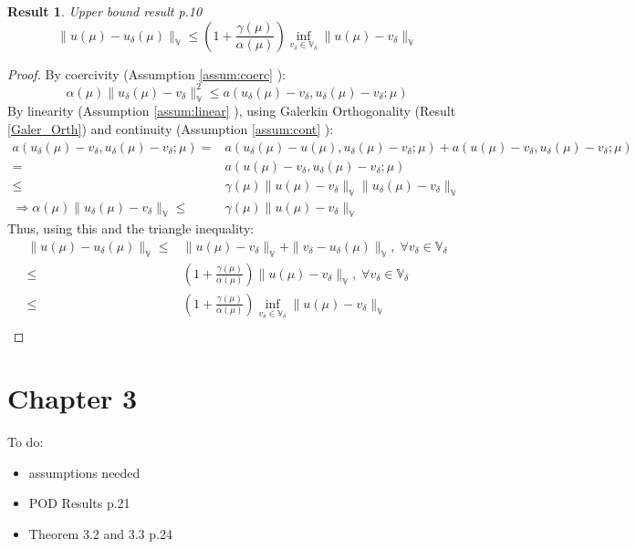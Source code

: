 \documentclass{article}
\newtheorem{result}{Result}
\begin{document}
\begin{result}{Upper bound result p.10}
$$ \| u(\mu )-u_\delta (\mu )\| _\mathbb{V}  \leq \left( 1+\frac{\gamma (\mu )}{\alpha (\mu )} \right) \inf _{v_\delta  \in \mathbb{V}_\delta }\| u(\mu )-v_\delta \| _\mathbb{V} $$
\end{result}

\begin{proof}
By coercivity (Assumption \ref{assum:coerc} ):
$$\alpha (\mu )\| u_ \delta (\mu )-v_\delta \|_\mathbb{V}^2 \leq a(u_ \delta (\mu )-v_\delta ,u_ \delta (\mu )-v_\delta ;\mu ) $$
By linearity (Assumption \ref{assum:linear} ), using Galerkin Orthogonality (Result \ref{Galer_Orth}) and continuity (Assumption \ref{assum:cont} ):
\begin{align*}
a(u_ \delta (\mu )-v_\delta ,u_ \delta (\mu )-v_\delta ;\mu )=&a(u_ \delta (\mu )-u(\mu ) ,u_ \delta (\mu )-v_\delta ;\mu )+a(u(\mu )-v_\delta ,u_ \delta (\mu )-v_\delta ;\mu )\\
=&a(u(\mu )-v_\delta ,u_ \delta (\mu )-v_\delta ;\mu )\\
\leq &\gamma(\mu )\| u(\mu )-v_\delta \|_\mathbb{V} \| u_ \delta (\mu )-v_\delta \|_\mathbb{V}\\
\Rightarrow \alpha (\mu )\| u_ \delta (\mu )-v_\delta \| _\mathbb{V} \leq& \gamma(\mu )\| u(\mu )-v_\delta \|_\mathbb{V}
\end{align*}
Thus, using this and the triangle inequality:
\begin{align*}
\| u(\mu )-u_\delta (\mu )\| _\mathbb{V}  \leq &\| u(\mu )-v_\delta \| _\mathbb{V} + \| v_\delta -u_\delta (\mu )\| _\mathbb{V},\; \forall v_\delta \in \mathbb{V}_\delta \\
\leq &\left ( 1+\frac{\gamma (\mu )}{\alpha(\mu )}\right )\| u(\mu )-v_\delta \| _\mathbb{V},\; \forall v_\delta \in \mathbb{V}_\delta \\
\leq &\left ( 1+\frac{\gamma (\mu )}{\alpha(\mu )}\right )\inf_{v_\delta \in \mathbb{V}_\delta }\| u(\mu )-v_\delta \| _\mathbb{V}\\
\end{align*}

\end{proof}

\section*{Chapter 3}

To do:
\begin{itemize}
\item assumptions needed\\
\item POD Results p.21\\
\item Theorem 3.2 and 3.3 p.24\\
\end{itemize}




\end{document}
